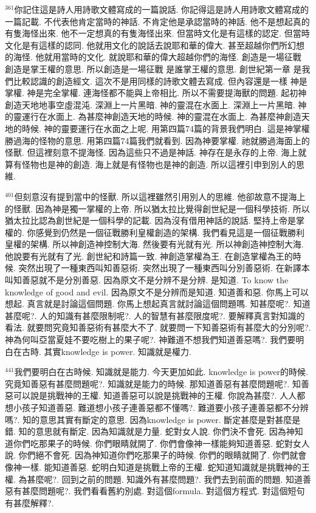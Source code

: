 \documentclass{book}
\begin{document}
$^{361}$你記住這是詩人用詩歌文體寫成的一篇說話.
你記得這是詩人用詩歌文體寫成的一篇記載.
不代表他肯定當時的神話.
不肯定他是承認當時的神話.
他不是想起真的有隻海怪出來.
他不一定想真的有隻海怪出來.
但當時文化是有這樣的認定.
但當時文化是有這樣的認同.
他就用文化的說話去說耶和華的偉大.
甚至超越你們所幻想的海怪.
他就用當時的文化.
就說耶和華的偉大超越你們的海怪.
創造是一場征戰 創造是掌王權的意思.
所以創造是一場征戰 是誰掌王權的意思.
創世紀第一章 是我們比較認識的創造經文.
這次不是用同樣的詩歌文體去寫成.
但內容還是一樣 神是掌權.
神是完全掌權.
連海怪都不能與上帝相比.
所以不需要提海獸的問題.
起初神創造天地地事空虛混沌.
深淵上一片黑暗.
神的靈混在水面上.
深淵上一片黑暗.
神的靈運行在水面上.
為甚麼神創造天地的時候.
神的靈混在水面上.
為甚麼神創造天地的時候.
神的靈要運行在水面之上呢.
用第四篇74篇的背景我們明白.
這是神掌權勝過海的怪物的意思.
用第四篇74篇我們就看到.
因為神要掌權.
祂就勝過海面上的怪獸.
但這裡刻意不提海怪.
因為這些只不過是神話.
神存在是永存的上帝.
海上就算有怪物也是神的創造.
海上就是有怪物也是神的創造.
所以這裡引申到別人的思維.

$^{401}$但刻意沒有提到當中的怪獸.
所以這裡雖然引用別人的思維.
他卻故意不提海上的怪獸.
因為神是獨一掌權的上帝.
所以猶太拉比覺得創世紀是一個科學技術.
所以猶太拉比認為創世紀是一個科學的記載.
因為沒有借用神話的說話.
堅持上帝是掌權的.
你感覺到仍然是一個征戰勝利皇權創造的架構.
我們看見這是一個征戰勝利皇權的架構.
所以神創造神控制大海.
然後要有光就有光.
所以神創造神控制大海.
他說要有光就有了光.
創世紀和詩篇一致.
神創造掌權為王.
在創造掌權為王的時候.
突然出現了一種東西叫知善惡術.
突然出現了一種東西叫分別善惡術.
在新譯本叫知善惡就不是分別善惡.
因為原文不是分辨不是分辨.
是知道.
To know the knowledge of good and evil.
因為原文不是分辨而是知道.
知道善和惡.
你馬上可以想起.
真言就是討論這個問題.
你馬上想起真言就討論這個問題嗎.
知甚麼呢?.
知道甚麼呢?.
人的知識有甚麼限制呢?.
人的智慧有甚麼限度呢?.
要解釋真言對知識的看法.
就要問究竟知善惡術有甚麼大不了.
就要問一下知善惡術有甚麼大的分別呢?.
神為何叫亞當夏娃不要吃樹上的果子呢?.
神難道不想我們知道善惡嗎?.
我們要明白在古時.
其實knowledge is power.
知識就是權力.

$^{441}$我們要明白在古時候.
知識就是能力.
今天更加如此.
knowledge is power的時候.
究竟知善惡有甚麼問題呢?.
知識就是能力的時候.
那知道善惡有甚麼問題呢?.
知善惡可以說是挑戰神的王權.
知道善惡可以說是挑戰神的王權.
你說為甚麼?.
人人都想小孩子知道善惡.
難道想小孩子連善惡都不懂嗎?.
難道要小孩子連善惡都不分辨嗎?.
知的意思其實有斷定的意思.
因為knowledge is power.
斷定甚麼是對甚麼是錯.
知的意思就有斷定.
因為知識就是力量.
蛇對女人說.
你們決不會死.
因為神知道你們吃那果子的時候.
你們眼睛就開了.
你們會像神一樣能夠知道善惡.
蛇對女人說.
你們絕不會死.
因為神知道你們吃那果子的時候.
你們的眼睛就開了.
你們就會像神一樣.
能知道善惡.
蛇明白知道是挑戰上帝的王權.
蛇知道知識就是挑戰神的王權.
為甚麼呢?.
回到之前的問題.
知識外有甚麼問題?.
我們去到前面的問題.
知道善惡有甚麼問題呢?.
我們看看舊約別處.
對這個formula.
對這個方程式.
對這個短句有甚麼解釋?.
\end{document}
